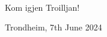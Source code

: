 \\
Kom igjen Troilljan!
\vspace*{\fill}
\begin{flushleft}
    Trondheim, 7th June 2024
    \hfill
\end{flushleft}